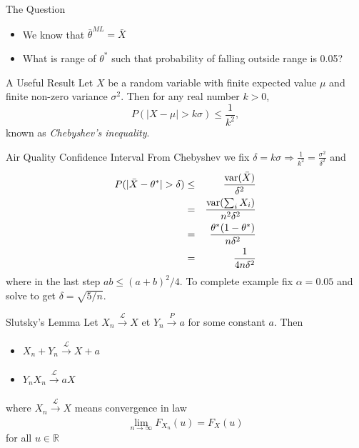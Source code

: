 \documentclass{beamer}
\begin{document}
 \begin{frame}{The Question}  
 \begin{itemize} 
  \item We know that $\bar{\theta}^{ML} = \bar{X}$ 
  \item What is range of $\theta^*$ such that probability of falling outside range is 0.05? 
 \end{itemize}
 \end{frame}

\begin{frame}{A Useful Result} 
Let $X$ be a random variable with finite expected value $\mu$ and finite non-zero variance $\sigma^2$. Then for any real number $k > 0$, 
\begin{displaymath} 
 P(|X - \mu| > k \sigma) \leq \frac{1}{k^2},
\end{displaymath}
known as \emph{Chebyshev's inequality}. 
\end{frame}

\begin{frame}{Air Quality Confidence Interval}  
From  Chebyshev we fix $\delta = k\sigma \Rightarrow \frac{1}{k^2} = \frac{\sigma^2}{\delta^2}$ and 
\begin{eqnarray*} 
 P(|\bar{X} - \theta^*| > \delta) &\leq& \frac{\mbox{var}(\bar{X})}{\delta^2} \\
&=& \frac{\mbox{var}(\sum_i X_i)}{n^2\delta^2} \\ 
&=& \frac{\theta^*(1 - \theta^*)}{n\delta^2}  \\ 
&=& \frac{1}{4n\delta^2}  
\end{eqnarray*}
where in the last step $ab \leq (a+b)^2/4$. To complete example fix $\alpha = 0.05$ and solve to get $\delta = \sqrt{5/n}$. 
\end{frame}

\begin{frame}{Slutsky's Lemma} 
Let $X_n \xrightarrow[]{\mathcal{L}} X$ et $Y_n \xrightarrow[]{P} a$ for some constant $a$. Then 
\begin{itemize} 
 \item $X_n + Y_n \xrightarrow[]{\mathcal{L}} X + a$
 \item $Y_nX_n \xrightarrow[]{\mathcal{L}} aX$ 
\end{itemize}
where $X_n \xrightarrow[]{\mathcal{L}} X$ means convergence in law 
\begin{displaymath} 
\lim_{n\rightarrow\infty} F_{X_n}(u) = F_X(u)
\end{displaymath}
for all $u \in \mathbb{R}$
\end{frame}
\end{document}
